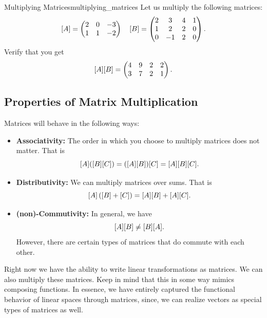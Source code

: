             \begin{ex}{Multiplying Matrices}{multiplying_matrices}
            Let us multiply the following matrices:
            \[
            [A]=\begin{pmatrix} 2 & 0 & -3\\ 1&1&-2\end{pmatrix} \quad [B]=\begin{pmatrix} 2&3&4&1\\1&2&2&0\\0&-1&2&0\end{pmatrix}.
            \]
            Verify that you get
            \[
            [A] [B]=\begin{pmatrix} 4&9&2&2\\3&7&2&1\end{pmatrix}.
            \]
            \end{ex}
            
            \subsection{Properties of Matrix Multiplication}
            
            Matrices will behave in the following ways:
            \begin{itemize}
                \item \textbf{Associativity:} The order in which you choose to multiply matrices does not matter.  That is 
                \[[A]([B] [C])=([A] [B])[C]=[A] [B] [C].\]
                \item \textbf{Distributivity:} We can multiply matrices over sums. That is
                \[
                [A]\left([B]+[C]\right)=[A] [B]+[A] [C].
                \]
                \item \textbf{(non)-Commutivity:} In general, we have
                \[
                [A] [B]\neq [B] [A].
                \]
                However, there are certain types of matrices that do commute with each other.
            \end{itemize}
        
        Right now we have the ability to write linear transformations as matrices.  We can also multiply these matrices.  Keep in mind that this in some way mimics composing functions. In essence, we have entirely captured the functional behavior of linear spaces through matrices, since, we can realize vectors as special types of matrices as well.
        
